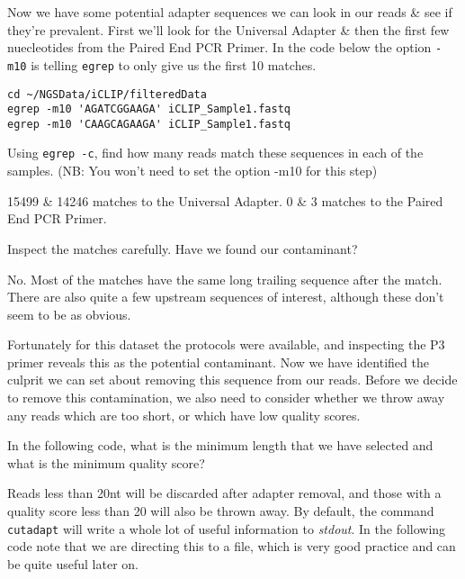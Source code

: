 \begin{steps}
Now we have some potential adapter sequences we can look in our reads \& see if they're prevalent.
First we'll look for the Universal Adapter \& then the first few nuecleotides from the Paired End PCR Primer.
In the code below the option \texttt{-m10} is telling \texttt{egrep} to only give us the first 10 matches.
\begin{lstlisting}
cd ~/NGSData/iCLIP/filteredData
egrep -m10 'AGATCGGAAGA' iCLIP_Sample1.fastq
egrep -m10 'CAAGCAGAAGA' iCLIP_Sample1.fastq
\end{lstlisting}
\end{steps}

\begin{questions}
Using \texttt{egrep -c}, find how many reads match these sequences in each of the samples.
(NB: You won't need to set the option -m10 for this step)\\
\begin{answer}
15499 \& 14246 matches to the Universal Adapter.
0 \& 3 matches to the Paired End PCR Primer.\\
\end{answer}

Inspect the matches carefully.
Have we found our contaminant? \\
\begin{answer}
No. 
Most of the matches have the same long trailing sequence after the match.
There are also quite a few upstream sequences of interest, although these don't seem to be as obvious.
\end{answer}
\end{questions}

Fortunately for this dataset the protocols were available, and inspecting the P3 primer reveals this as the potential contaminant.
Now we have identified the culprit we can set about removing this sequence from our reads.
Before we decide to remove this contamination, we also need to consider whether we throw away any reads which are too short, or which have low quality scores.

\begin{questions}
In the following code, what is the minimum length that we have selected and what is the minimum quality score?\\
\begin{answer}
Reads less than 20nt will be discarded after adapter removal, and those with a quality score less than 20 will also be thrown away.
By default, the command \texttt{cutadapt} will write a whole lot of useful information to \textit{stdout}.
In the following code note that we are directing this to a file, which is very good practice and can be quite useful later on.
\end{answer}
\end{questions}

